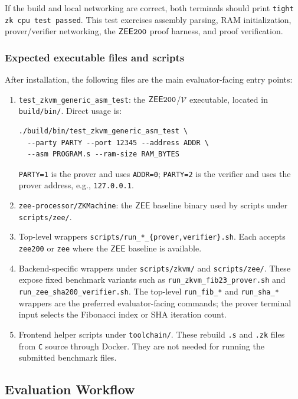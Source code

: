 \documentclass[nonacm,sigconf]{acmart}
\newcommand{\oursystem}{$\mathsf{ZEE}\tt{200}$\xspace}
\newcommand{\zee}[0]{\ensuremath{\mathsf{ZEE}}\xspace}
\let\P\undefined
\newcommand{\P}{\ensuremath{\mathcal{P}}\xspace}
\newcommand{\V}{\ensuremath{\mathcal{V}}\xspace}
\newcommand{\passmsg}{\texttt{tight zk cpu test passed}}
\newcommand{\zkvmbin}{\texttt{test\_zkvm\_generic\_asm\_test}}
\begin{document}
If the build and local networking are correct, both terminals should
print \passmsg. This test exercises assembly parsing, RAM
initialization, prover/verifier networking, the \oursystem proof harness,
and proof verification.

\subsubsection{Expected executable files and scripts}

After installation, the following files are the main evaluator-facing
entry points:
\begin{enumerate}
\item \zkvmbin: the \oursystem \P/\V executable, located in
\texttt{build/bin/}. Direct usage is:
\begin{verbatim}
./build/bin/test_zkvm_generic_asm_test \
  --party PARTY --port 12345 --address ADDR \
  --asm PROGRAM.s --ram-size RAM_BYTES
\end{verbatim}
\texttt{PARTY=1} is the prover and uses \texttt{ADDR=0};
\texttt{PARTY=2} is the verifier and uses the prover address, e.g.,
\texttt{127.0.0.1}.

\item \texttt{zee-processor/ZKMachine}: the \zee baseline binary used
by scripts under \texttt{scripts/zee/}.

\item Top-level wrappers
\texttt{scripts/run\_*\_\{prover,verifier\}.sh}. Each accepts
\texttt{zee200} or \texttt{zee} where the \zee baseline is available.

\item Backend-specific wrappers under \texttt{scripts/zkvm/} and
\texttt{scripts/zee/}. These expose fixed benchmark variants such as
\texttt{run\_zkvm\_fib23\_prover.sh} and
\texttt{run\_zee\_sha200\_verifier.sh}. The top-level
\texttt{run\_fib\_*} and \texttt{run\_sha\_*} wrappers are the preferred
evaluator-facing commands; the prover terminal input selects the
Fibonacci index or SHA iteration count.

\item Frontend helper scripts under \texttt{toolchain/}. These rebuild
\texttt{.s} and \texttt{.zk} files from {\tt C} source through Docker. They
are not needed for running the submitted benchmark files.
\end{enumerate}

\subsection{Evaluation Workflow}
\end{document}
